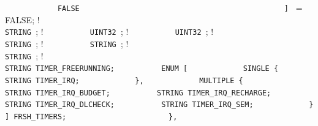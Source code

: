 {{\lstinline!            FALSE                                    ! \newline
\lstinline!          ] ! = FALSE;        ! \newline
\lstinline!                                                     ! \newline
\lstinline!          STRING !;             ! \newline
\lstinline!          UINT32 !;              ! \newline
\lstinline!          UINT32 !;   ! \newline
\lstinline!                                                     ! \newline
\lstinline!          STRING !;   ! \newline
\lstinline!          STRING !;   ! \newline
\lstinline!                                                     ! \newline
\lstinline!          STRING !;       ! \newline
\lstinline!                                                     ! \newline
\lstinline!  ! \newline
\lstinline!          STRING TIMER_FREERUNNING;! \newline
\lstinline!          ENUM [! \newline
\lstinline!            SINGLE {! \newline
\lstinline!              STRING TIMER_IRQ;! \newline
\lstinline!            },! \newline
\lstinline!            MULTIPLE {! \newline
\lstinline!	         STRING TIMER_IRQ_BUDGET;! \newline
\lstinline!	         STRING TIMER_IRQ_RECHARGE;! \newline
\lstinline!	         STRING TIMER_IRQ_DLCHECK;! \newline
\lstinline!	         STRING TIMER_IRQ_SEM;! \newline
\lstinline!            }! \newline
\lstinline!          ] FRSH_TIMERS; ! \newline
\lstinline!             ! \newline
\lstinline!        },  ! \newline
}}
